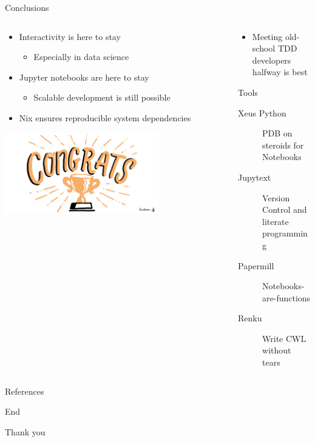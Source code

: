 \documentclass[bigger,unknownkeysallowed,aspectratio=169,red,colorblocks]{beamer}
\begin{document}
\begin{frame}[label={sec:orgf77731b}]{Conclusions}
\begin{columns}
\begin{column}{0.6\columnwidth}
\begin{itemize}
\item Interactivity is here to stay
\begin{itemize}
\item Especially in data science
\end{itemize}
\item Jupyter notebooks are here to stay
\begin{itemize}
\item Scalable development is still possible
\end{itemize}
\item Nix ensures reproducible system dependencies
\end{itemize}

\begin{center}
\includegraphics[width=0.7\textwidth]{images/turingWay/BannerCongratulations.jpg}
\end{center}
\end{column}
\begin{column}{0.4\columnwidth}
\begin{itemize}
\item Meeting old-school TDD developers halfway is best
\end{itemize}
\begin{block}{Tools}
\begin{description}
\item[{Xeus Python}] PDB on steroids for Notebooks
\item[{Jupytext}] Version Control and literate programming
\item[{Papermill}] Notebooks-are-functions
\item[{Renku}] Write CWL without tears
\end{description}
\end{block}
\end{column}
\end{columns}
\end{frame}
\begin{frame}[allowframebreaks]{References}
\printbibliography
\end{frame}

\begin{frame}[label={sec:orge8418ab},standout]{End}
\begin{center}
  \Huge Thank you
\end{center}
\end{frame}
\end{document}
